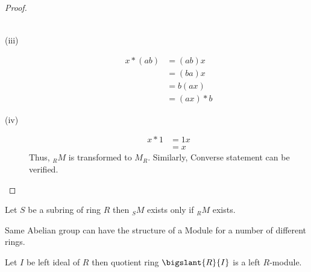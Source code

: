 \begin{proof}
\begin{description}
\begin{align*}
\end{align*}
       \item[(iii)]

\begin{align*}
       x*(ab) &= (ab)x \\ &= (ba)x \\ &= b(ax) \\ &= (ax)*b
       
\end{align*}
   \item[(iv)]

\begin{align*}
   x*1 &= 1x \\  &= x
   
\end{align*}
Thus, $_{R}M$ is transformed to $M_R$.\newline
Similarly, Converse statement can be verified.

\end{description}
\end{proof}
 \bigskip

\begin{remark}
	Let $S$ be a subring of ring $R$ then $_{S}M$ exists   only if $_{R}M$ exists.
\end{remark}
 \bigskip

\begin{remark}
	Same Abelian group can have the structure of a Module for a number of different rings.
\end{remark}
 \bigskip

\begin{remark}
Let $I$ be left ideal of $R$ then quotient ring $\bigslant{R}{I}$ is a left $R$-module.

\end{remark}

